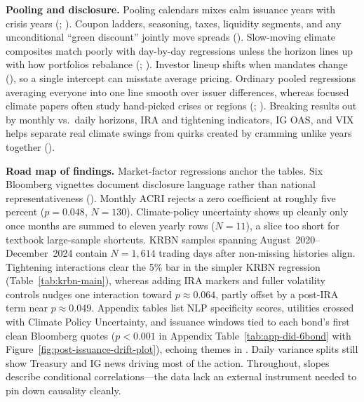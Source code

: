 \documentclass[
  11pt,
]{article}
\begin{document}
\textbf{Pooling and disclosure.} Pooling calendars mixes calm issuance years with crisis years (; ). Coupon ladders, seasoning, taxes, liquidity segments, and any unconditional ``green discount'' jointly move spreads (). Slow-moving climate composites match poorly with day-by-day regressions unless the horizon lines up with how portfolios rebalance (; ). Investor lineup shifts when mandates change (), so a single intercept can misstate average pricing. Ordinary pooled regressions averaging everyone into one line smooth over issuer differences, whereas focused climate papers often study hand-picked crises or regions (; ). Breaking results out by monthly vs.\ daily horizons, IRA and tightening indicators, IG OAS, and VIX helps separate real climate swings from quirks created by cramming unlike years together ().

\textbf{Road map of findings.} Market-factor regressions anchor the tables. Six Bloomberg vignettes document disclosure language rather than national representativeness (). Monthly ACRI rejects a zero coefficient at roughly five percent ($p = 0.048$, $N = 130$). Climate-policy uncertainty shows up cleanly only once months are summed to eleven yearly rows ($N = 11$), a slice too short for textbook large-sample shortcuts. KRBN samples spanning August~2020--December~2024 contain $N = 1{,}614$ trading days after non-missing histories align. Tightening interactions clear the 5\% bar in the simpler KRBN regression (Table~\ref{tab:krbn-main}), whereas adding IRA markers and fuller volatility controls nudges one interaction toward $p \approx 0.064$, partly offset by a post-IRA term near $p \approx 0.049$. Appendix tables list NLP specificity scores, utilities crossed with Climate Policy Uncertainty, and issuance windows tied to each bond's first clean Bloomberg quotes ($p < 0.001$ in Appendix Table~\ref{tab:app-did-6bond} with Figure~\ref{fig:post-issuance-drift-plot}), echoing themes in . Daily variance splits still show Treasury and IG news driving most of the action. Throughout, slopes describe conditional correlations---the data lack an external instrument needed to pin down causality cleanly.
\end{document}
